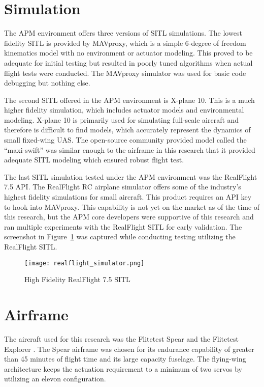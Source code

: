 \section{Simulation}
The \ac{APM} environment offers three versions of \ac{SITL} simulations.  The lowest fidelity \ac{SITL} is provided by MAVproxy, which is a simple 6-degree of freedom kinematics model with no environment or actuator modeling.  This proved to be adequate for initial testing but resulted in poorly tuned algorithms when actual flight tests were conducted.  The MAVproxy simulator was used for basic code debugging but nothing else.

The second \ac{SITL} offered in the \ac{APM} environment is X-plane 10.  This is a much higher fidelity simulation, which includes actuator models and environmental modeling.  X-plane 10 is primarily used for simulating full-scale aircraft and therefore is difficult to find models, which accurately represent the dynamics of small fixed-wing \ac{UAS}.  The open-source community provided model called the \enquote{maxi-swift} was similar enough to the airframe in this research that it provided adequate \ac{SITL} modeling which ensured robust flight test.

The last \ac{SITL} simulation tested under the \ac{APM} environment was the RealFlight 7.5 \ac{API}.  The RealFlight \ac{RC} airplane simulator offers some of the industry's highest fidelity simulations for small aircraft.  This product requires an \ac{API} key to hook into MAVproxy.  This capability is not yet on the market as of the time of this research, but the \ac{APM} core developers were supportive of this research and ran multiple experiments with the RealFlight \ac{SITL} for early validation.  The screenshot in Figure~\ref{fig:realflight_sitl} was captured while conducting testing utilizing the RealFlight \ac{SITL}.

\begin{figure}[h!]
 \centering
  \texttt{[image: realflight\_simulator.png]}
  \caption{High Fidelity RealFlight 7.5 \ac{SITL}}
  \label{fig:realflight_sitl}
\end{figure}


\section{Airframe}

The aircraft used for this research was the Flitetest Spear and the Flitetest Explorer \cite{flitetest}.  The Spear airframe was chosen for its endurance capability of greater than 45 minutes of flight time and its large capacity fuselage.  The flying-wing architecture keeps the actuation requirement to a minimum of two servos by utilizing an elevon configuration.

